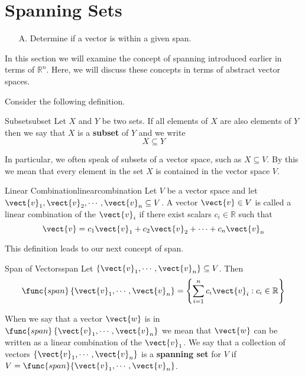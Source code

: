 \section{Spanning Sets}

\begin{outcome}
\begin{enumerate}
\item[A.] Determine if a vector is within a given span.
\end{enumerate}
\end{outcome}

In this section we will examine the concept of spanning introduced earlier in terms of $\mathbb{R}^n$. Here, we will discuss these concepts in terms of abstract vector spaces. 

Consider the following definition. 

\begin{definition}{Subset}{subset}
Let $X$ and $Y$ be two sets. If all elements of $X$ are also elements of $Y$ then we say that $X$ is a \textbf{subset} of $Y$ and we write
\[
X \subseteq Y
\]
\end{definition}

In particular, we often speak of subsets of a vector space, such as $X \subseteq V$. By this we mean that every element in the set $X$ is contained in the vector space $V$. 

\begin{definition}{Linear Combination}{linearcombination}
Let $V$ be a vector space and let $\vect{v}_1, \vect{v}_2, \cdots, \vect{v}_n \subseteq V$. A vector $\vect{v} \in V$ is called a linear combination of the $\vect{v}_i$ if there exist scalars $c_i \in \mathbb{R}$ such that 
\[
\vect{v} = c_1 \vect{v}_1 + c_2 \vect{v}_2 + \cdots + c_n \vect{v}_n
\]
\end{definition}

This definition leads to our next concept of span.

\begin{definition}{Span of Vectors}{span}
Let $\{\vect{v}_{1},\cdots ,\vect{v}_{n}\} \subseteq V$. Then 
\begin{equation*}
\func{span}\left\{ \vect{v}_{1},\cdots ,\vect{v}_{n}\right\} = 
\left\{ \sum_{i=1}^{n}c_{i}\vect{v}_{i}: c_{i}\in \mathbb{R}
\right\} 
\end{equation*}
\end{definition}

When we say that a vector $\vect{w}$ is in $\func{span}\left\{ \vect{v}_{1},\cdots ,\vect{v}_{n}\right\}$ we mean that $\vect{w}$ can be written as a linear combination of the $\vect{v}_1$. We say that a collection of vectors $\{\vect{v}_{1},\cdots ,\vect{v}_{n}\}$ is a \textbf{spanning set} for $V$ if $V = \func{span} \{\vect{v}_{1},\cdots ,\vect{v}_{n}\}$. 


